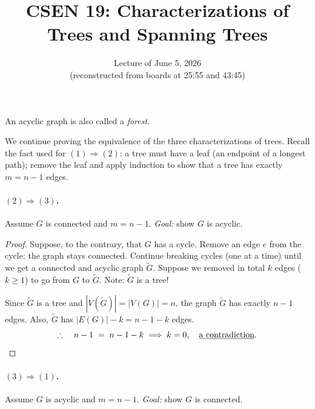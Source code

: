 \documentclass[11pt]{article}
\title{CSEN 19: Characterizations of Trees and Spanning Trees}
\date{Lecture of June 5, 2026 \\ \small (reconstructed from boards at 25:55 and 43:45)}
\author{}
\theoremstyle{definition}
\begin{document}
\maketitle

\noindent
An acyclic graph is also called a \emph{forest}.
%
\begin{center}
\end{center}

We continue proving the equivalence of the three characterizations of trees.
Recall the fact used for $(1)\Rightarrow(2)$: a tree must have a leaf (an
endpoint of a longest path); remove the leaf and apply induction to show that
a tree has exactly $m = n-1$ edges.

\paragraph{$(2)\Rightarrow(3)$.}
Assume $G$ is connected and $m = n-1$. \emph{Goal:} show $G$ is acyclic.

\begin{proof}
Suppose, to the contrary, that $G$ has a cycle. Remove an edge $e$ from the
cycle: the graph stays connected. Continue breaking cycles (one at a time)
until we get a connected and acyclic graph $\widetilde{G}$. Suppose we removed
in total $k$ edges ($k \ge 1$) to go from $G$ to $\widetilde{G}$.
Note: $\widetilde{G}$ is a tree!

Since $\widetilde{G}$ is a tree and
$|V(\widetilde{G})| = |V(G)| = n$, the graph $\widetilde{G}$ has exactly
$n-1$ edges. Also, $\widetilde{G}$ has $|E(G)| - k = n - 1 - k$ edges.
\[
  \therefore\quad n-1 \;=\; n-1-k \;\Longrightarrow\; k = 0,
  \quad \text{\underline{a contradiction}}.
\]
\end{proof}

\paragraph{$(3)\Rightarrow(1)$.}
Assume $G$ is acyclic and $m = n-1$. \emph{Goal:} show $G$ is connected.
\end{document}
